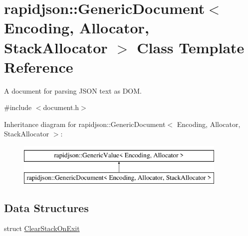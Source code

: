 \hypertarget{classrapidjson_1_1_generic_document}{}\section{rapidjson\+::Generic\+Document$<$ Encoding, Allocator, Stack\+Allocator $>$ Class Template Reference}
\label{classrapidjson_1_1_generic_document}


A document for parsing J\+S\+ON text as D\+OM.  




{\ttfamily \#include $<$document.\+h$>$}

Inheritance diagram for rapidjson\+::Generic\+Document$<$ Encoding, Allocator, Stack\+Allocator $>$\+:\begin{figure}[H]
\begin{center}
\leavevmode
\includegraphics[height=2.000000cm]{classrapidjson_1_1_generic_document}
\end{center}
\end{figure}
\subsection*{Data Structures}
\begin{DoxyCompactItemize}
\item 
struct \mbox{\hyperlink{structrapidjson_1_1_generic_document_1_1_clear_stack_on_exit}{Clear\+Stack\+On\+Exit}}
\end{DoxyCompactItemize}

